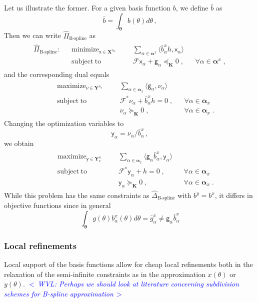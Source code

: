\documentclass{article}
\DeclareMathOperator*{\minimize}{minimize}
\DeclareMathOperator*{\maximize}{maximize}
\DeclareMathOperator*{\subj}{subject\;to}
\newcommand{\commentWVL}[1]{\noindent \textcolor{blue}{\emph{$<\,$WVL: #1$\,>$}}}%
\newcommand{\ppar}{\theta}                          %
\newcommand{\Ppar}{{\bm{\theta}}}                   %
\newcommand{\X}{\mathbf{X}}                         %
\newcommand{\Y}{\mathbf{Y}}                         %
\newcommand{\K}{\mathbf{K}}                         %
\newcommand{\calF}{\mathcal{F}}                     %
\newcommand{\cx}{\textsf{x}}        %
\newcommand{\cy}{\textsf{y}}        %
\newcommand{\Alpha}{\bm{\alpha}}    %
\newcommand{\cg}{\textsf{g}}            %
\begin{document}
Let us illustrate the former. For a given basis function $b$, we define $\bar{b}$ as
\[ \bar{b} = \int_{\Ppar} b(\ppar) d\ppar  \,,
\]
Then we can write $\hat{\Pi}_\text{B-spline}$ as
\begin{gather*}
\begin{aligned}
\hat{\Pi}_\text{B-spline}: && \minimize_{\cx\in\X^{n_x}} &&& \sum_{\alpha\in\Alpha^x} \langle \bar{b}^x_\alpha h, \cx_\alpha \rangle    \\%
                           && \subj                      &&& \calF \cx_\alpha + \cg_\alpha \preceq_\K 0 \;, && \forall \alpha\in \Alpha^x\;,%
\end{aligned}
\end{gather*}
and the corresponding dual equals
\begin{gather*}
\begin{aligned}
 && \maximize_{\nu\in\Y^{n_x}} &&& \sum_{\alpha\in\Alpha_x} \langle \cg_\alpha, \nu_\alpha \rangle    \\%
 && \subj                      &&& \calF^* \nu_\alpha +  \bar{b}^x_\alpha h = 0 \;, && \forall \alpha\in \Alpha_x\\%
 &&                            &&& \nu_\alpha \succeq_\K 0 \;, && \forall \alpha\in \Alpha_x\;.%
\end{aligned}
\end{gather*}
Changing the optimization variables to
\[ \cy_\alpha = \nu_\alpha / \bar{b}^x_\alpha \,,
\]
we obtain
\begin{gather*}
\begin{aligned}
 && \maximize_{\cy\in\Y^n_x} &&& \sum_{\alpha\in\Alpha_x} \langle \cg_\alpha \bar{b}^x_\alpha , \cy_\alpha \rangle    \\%
 && \subj                    &&& \calF^* \cy_\alpha + h = 0 \;, && \forall \alpha\in \Alpha_x\\%
 &&                          &&& \cy_\alpha \succeq_\K 0 \;, && \forall \alpha\in \Alpha_x\;.%
\end{aligned}
\end{gather*}
While this problem has the same constraints as $\hat{\Delta}_{\text{B-spline}}$ with $b^y=b^x$, it differs in objective functions since in general
\[ \int_\Ppar g(\ppar)b^x_\alpha(\ppar)d\ppar = \bar{g}^x_\alpha \neq \cg_\alpha \bar{b}^x_\alpha%
\]



\subsubsection{Local refinements}
Local support of the basis functions allow for cheap local refinements both in the relaxation of the semi-infinite constraints as in the approximation $x(\ppar)$ or $y(\ppar)$.
\commentWVL{Perhaps we should look at literature concerning subdivision schemes
for B-spline approximation}
\end{document}

